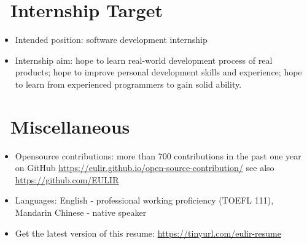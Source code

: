 \documentclass{resume}
\begin{document}
\section{\faUsers\ Internship Target}
\begin{itemize}[parsep=0.5ex]
  \item Intended position: software development internship
  \item Internship aim: hope to learn real-world development process of real products; hope to improve personal development skills and experience; hope to learn from experienced programmers to gain solid ability.
\end{itemize}

\section{\faInfo\ Miscellaneous}
\begin{itemize}[parsep=0.5ex]
  \item Opensource contributions: more than 700 contributions in the past one year on GitHub \url{https://eulir.github.io/open-source-contribution/} 
    see also {\url{https://github.com/EULIR}}
  \item Languages: English - professional working proficiency (TOEFL 111), Mandarin Chinese - native speaker
  \item Get the latest version of this resume: \url{https://tinyurl.com/eulir-resume}
\end{itemize}
\end{document}
